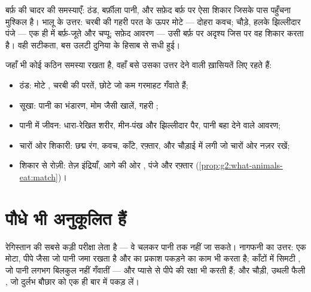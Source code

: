 \begin{example}[ध्रुवीय भालू, टुकड़ा-टुकड़ा]\label{ex:g4:adapted-to-their-world:bear}
बर्फ़ की चादर की समस्याएँ: ठंड, बर्फ़ीला पानी, और सफ़ेद बर्फ़ पर ऐसा
शिकार जिसके पास पहुँचना मुश्किल है। भालू के उत्तर: चरबी की गहरी परत के
ऊपर मोटे  --- दोहरा कवच; चौड़े, हलके झिल्लीदार पंजे --- एक ही में
बर्फ़-जूते और चप्पू; सफ़ेद आवरण --- उसी बर्फ़ पर अदृश्य जिस पर वह शिकार
करता है। वही सटीकता, बस उलटी दुनिया के हिसाब से सधी हुई।
\end{example}

\begin{proposition}[अनुकूलन समस्याओं के उत्तर हैं]\label{prop:g4:adapted-to-their-world:answers}
जहाँ भी  कोई कठिन समस्या रखता है, वहाँ बसे  उसका उत्तर देने
वाली ख़ासियतें लिए रहते हैं:
\begin{itemize}
  \item ठंड: मोटे , चरबी की परतें, छोटे  जो कम गरमाहट गँवाते
        हैं;
  \item सूखा: पानी का भंडारण, मोम जैसी खालें, गहरी ;
  \item पानी में जीवन: धारा-रेखित शरीर, मीन-पंख और झिल्लीदार पैर,
        पानी बहा देने वाले आवरण;
  \item चारों ओर शिकारी: छद्म रंग, कवच, काँटे, रफ़्तार, और चौड़ाई में
        लगी  जो चारों ओर नज़र रखें;
  \item शिकार से रोज़ी: तेज़ इंद्रियाँ, आगे की ओर , पंजे और
        रफ़्तार (\cref{prop:g2:what-animals-eat:match})।
\end{itemize}
\end{proposition}
\admitted

\section{पौधे भी अनुकूलित हैं}

\begin{example}[नागफनी]\label{ex:g4:adapted-to-their-world:cactus}
रेगिस्तान  की सबसे कड़ी परीक्षा लेता है --- वे चलकर पानी तक नहीं
जा सकते। नागफनी का उत्तर: एक मोटा, पीपे जैसा  जो पानी जमा रखता है
और  का प्रकाश पकड़ने का काम भी करता है; काँटों में सिमटी
, जो पानी लगभग बिलकुल नहीं गँवातीं --- और प्यासे  से पीपे
की रक्षा भी करती हैं; और चौड़ी, उथली फैली , जो दुर्लभ बौछार को एक
ही बार में पकड़ लें।
\end{example}

